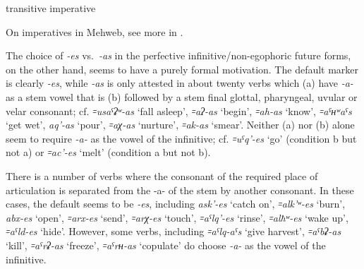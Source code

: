 \documentclass[output=paper]{langsci/langscibook}
\begin{document}
\ex %
transitive imperative

\ea {}%
\exsameline {}

\ex {}%
\exsameline {}

\z
\z
On imperatives in Mehweb, see more in \citet{dobrushina2019}.

The choice of \emph{-es} vs.\ \emph{-as} in the perfective infinitive/non-egophoric future forms, on the other
hand, seems to have a purely formal motivation. The default marker is
clearly \emph{-es}, while \emph{-as} is only attested in about twenty
verbs which (a) have \emph{-a-} as a stem vowel that is (b) followed by a
stem final glottal, pharyngeal, uvular or velar consonant; cf.
\emph{꞊usaˤʡʷ-as} `fall asleep', \emph{꞊aʔ-as} `begin', \emph{꞊ah-as}
`know', \emph{꞊aˤʜʷaˤs} `get wet', \emph{aq'-as} `pour', \emph{꞊aχ-as}
`nurture', \emph{꞊ak-as} `smear'. Neither (a) nor (b) alone
seem to require \emph{-a-} as the vowel of the infinitive; cf.
\emph{꞊uˤq'-es} `go' (condition b but not a) or \emph{꞊ac'-es} `melt'
(condition a but not b).

There is a number of verbs where the consonant of the required place of
articulation is separated from the -a- of the stem by another consonant.
In these cases, the default seems to be \emph{-es}, including
\emph{ask'-es} `catch on', \emph{꞊alk'ʷ-es} `burn', \mbox{\emph{abx-es}}
`open', \emph{꞊arx-es} `send', \emph{꞊arχ-es} `touch', \emph{꞊aˤlq'-es}
`rinse', \emph{꞊alħʷ-es} `wake up', \mbox{\emph{꞊aˤld-es}} `hide'. However,
some verbs, including \emph{꞊aˤlq-aˤs} `give harvest', \mbox{\emph{꞊aˤbʡ-as}}
`kill', \mbox{\emph{꞊aˤrʡ-as}} `freeze', \emph{꞊aˤrʜ-as} `copulate' do choose
\emph{-a-} as the vowel of the infinitive.
{\par}
\end{document}
